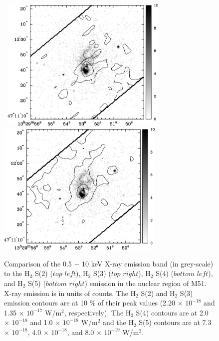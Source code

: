 \documentclass[manuscript]{aastex}
\begin{document}
\begin{figure}[!h]
\centerline{\hbox{\hspace{0.0in}
\includegraphics[width=8cm,angle=0]{bw_x_v_h2s4.jpg}
\hspace{0.1in}
\includegraphics[width=8cm,angle=0]{bw_x_v_h2s5.jpg}}}
\caption{Comparison of the 0.5 $-$ 10 keV X-ray emission band (in grey-scale) to the $\mathrm{H_2}$ S(2) ($top$ $left$), $\mathrm{H_2}$ S(3) ($top$ $right$), $\mathrm{H_2}$ S(4) ($bottom$ $left$), and $\mathrm{H_2}$ S(5) ($bottom$ $right$) emission in the nuclear region of M51.  X-ray emission is in units of counts.  The $\mathrm{H_2}$ S(2) and $\mathrm{H_2}$ S(3) emission contours are at 10 \% of their peak values (2.20 $\times$ ${10^{-18}}$ and 1.35 $\times$ ${10^{-17}}$ W/$\mathrm{m^2}$, respectively).  The $\mathrm{H_2}$ S(4) contours are at  2.0 $\times$ ${10^{-18}}$ and 1.0 $\times$ ${10^{-18}}$ W/$\mathrm{m^2}$ and the $\mathrm{H_2}$ S(5) contours are at 7.3 $\times$ ${10^{-18}}$, 4.0 $\times$ ${10^{-18}}$, and 8.0 $\times$ ${10^{-19}}$ W/$\mathrm{m^2}$.\label{fig13}}
\end{figure}


\clearpage
\end{document}
